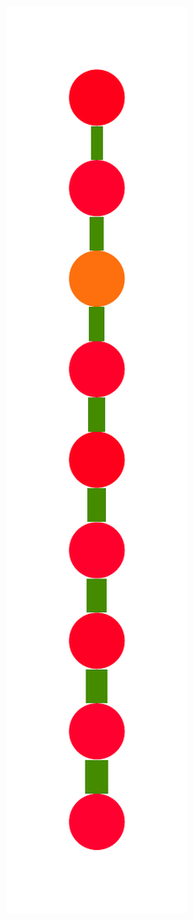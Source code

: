 \documentclass[a4paper,10pt]{article}
\begin{document}
\begin{figure}
{    \includegraphics[scale=.14]{./figures/6-3-recursion-induced-2.pdf}
}
\end{figure}
\end{document}
